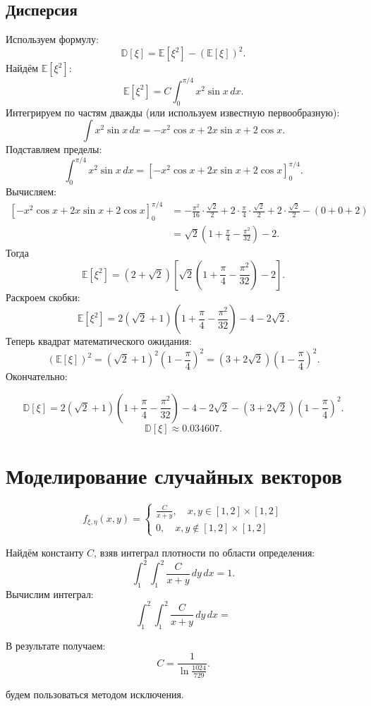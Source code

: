 \documentclass[bachelor, och, pract3]{SCWorks}
\begin{document}
\subsection{Дисперсия}
Используем формулу:
\[
\mathbb D[\xi]=\mathbb E[\xi^2]-(\mathbb E[\xi])^2.
\]
Найдём \(\mathbb E[\xi^2]\):
\[
\mathbb E[\xi^2]=C\int_0^{\pi/4} x^2\sin x\,dx.
\]
Интегрируем по частям дважды (или используем известную первообразную):
\[
\int x^2\sin x\,dx = -x^2\cos x+2x\sin x+2\cos x.
\]
Подставляем пределы:
\[
\int_0^{\pi/4} x^2\sin x\,dx
= \left[-x^2\cos x+2x\sin x+2\cos x\right]_0^{\pi/4}.
\]
Вычисляем:
\[
\begin{aligned}
\left[-x^2\cos x+2x\sin x+2\cos x\right]_0^{\pi/4}
&= -\frac{\pi^2}{16}\cdot\frac{\sqrt2}{2}
+2\cdot\frac{\pi}{4}\cdot\frac{\sqrt2}{2}
+2\cdot\frac{\sqrt2}{2} - (0+0+2) \\
&= \sqrt2\left(1+\frac{\pi}{4}-\frac{\pi^2}{32}\right)-2.
\end{aligned}
\]
Тогда
\[
\mathbb E[\xi^2]=(2+\sqrt2)\left[\sqrt2\left(1+\frac{\pi}{4}-\frac{\pi^2}{32}\right)-2\right].
\]
Раскроем скобки:
\[
\mathbb E[\xi^2]
=2(\sqrt2+1)\left(1+\frac{\pi}{4}-\frac{\pi^2}{32}\right)-4-2\sqrt2.
\]
Теперь квадрат математического ожидания:
\[
(\mathbb E[\xi])^2=(\sqrt2+1)^2\left(1-\frac{\pi}{4}\right)^2
= (3+2\sqrt2)\left(1-\frac{\pi}{4}\right)^2.
\]
Окончательно:

\[
\mathbb D[\xi]
=2(\sqrt2+1)\left(1+\frac{\pi}{4}-\frac{\pi^2}{32}\right)-4-2\sqrt2-(3+2\sqrt2)\left(1-\frac{\pi}{4}\right)^2
.
\]
\[
\mathbb D[\xi] \approx 0.034607.
\]




\section{Моделирование случайных векторов}

\[
f_{\xi, \eta }(x,y) =
\begin{cases}
    \displaystyle\frac{C}{x+y}, \quad x,y \in [1, 2] \times [1, 2] \\
	0, \quad x,y \notin [1, 2] \times [1, 2]
\end{cases}
\]

Найдём константу \(C\), взяв интеграл плотности по области определения:
\[
\int_1^2 \int_1^2 \frac{C}{x+y} \, dy \, dx = 1.
\]
Вычислим интеграл:
\[
\int_1^2 \int_1^2 \frac{C}{x+y} \, dy \, dx =
\]

В результате получаем:
\[
C = \frac{1}{\ln \frac{1024}{729}}.
\]


будем пользоваться методом исключения.
\end{document}
